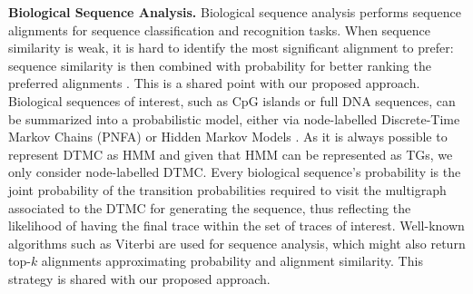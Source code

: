 \smallskip
\noindent
\textbf{Biological Sequence Analysis.}
Biological sequence analysis performs sequence alignments for sequence classification and recognition tasks. When sequence similarity is weak, it is hard to identify the most significant alignment to prefer: sequence similarity is then combined with probability for better ranking the preferred alignments \cite{durbin1998biological}. This is a shared point with our proposed approach. 
%
Biological sequences of interest, such as CpG islands or full DNA sequences, can be summarized into a probabilistic model, either via node-labelled Discrete-Time Markov Chains (PNFA) \cite{RyabkoU08} or Hidden Markov Models \cite{Helske2018}. As it is always possible to represent DTMC as HMM \cite{DUPONT20051349} and given that HMM can be represented as TGs, we only consider node-labelled DTMC. %
Every biological sequence's probability is the joint probability of the transition probabilities required to visit the multigraph associated to the DTMC for generating the sequence, thus %
reflecting the likelihood of having the final trace within the set of traces of interest. 
%
Well-known algorithms such as Viterbi are used for sequence analysis, which might also return top-$k$ alignments \cite{577040} approximating probability and alignment similarity.
This strategy is shared with our proposed approach. 
